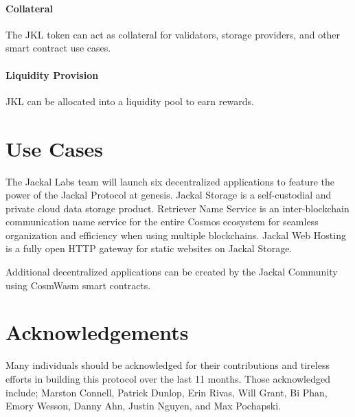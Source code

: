 \documentclass[a4paper]{article}
\begin{document}
\paragraph{Collateral}
The JKL token can act as collateral for validators, storage providers, and other smart contract use cases. 

\paragraph{Liquidity Provision}
JKL can be allocated into a liquidity pool to earn rewards. 

\section{Use Cases}
The Jackal Labs team will launch six decentralized applications to feature the power of the Jackal Protocol at genesis. Jackal Storage is a self-custodial and private cloud data storage product. Retriever Name Service is an inter-blockchain communication name service for the entire Cosmos ecosystem for seamless organization and efficiency when using multiple blockchains. Jackal Web Hosting is a fully open HTTP gateway for static websites on Jackal Storage. 

Additional decentralized applications can be created by the Jackal Community using CosmWasm smart contracts. 

\section{Acknowledgements}
Many individuals should be acknowledged for their contributions and tireless efforts in building this protocol over the last 11 months. Those acknowledged include; Marston Connell, Patrick Dunlop, Erin Rivas, Will Grant, Bi Phan, Emory Wesson, Danny Ahn, Justin Nguyen, and Max Pochapski. 

\newpage
\printbibliography %
\end{document}
